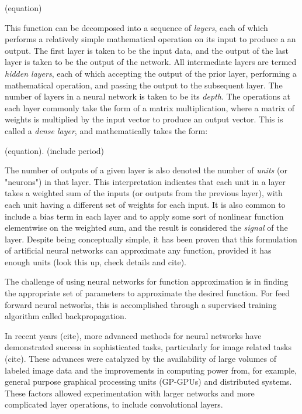 (equation)

This function can be decomposed into a sequence of \textit{layers}, each of which performs a relatively simple mathematical operation on its input to produce a an output.
The first layer is taken to be the input data, and the output of the last layer is taken to be the output of the network. 
All intermediate layers are termed \textit{hidden layers}, each of which accepting the output of the prior layer, performing a mathematical operation, and passing the output to the subsequent layer.
The number of layers in a neural network is taken to be its \textit{depth}.
The operations at each layer commonly take the form of a matrix multiplication, where a matrix of weights is multiplied by the input vector to produce an output vector.
This is called a \textit{dense layer}, and mathematically takes the form:

(equation). (include period)

The number of outputs of a given layer is also denoted the number of \textit{units} (or "neurons") in that layer.
This interpretation indicates that each unit in a layer takes a weighted sum of the inputs (or outputs from the previous layer), with each unit having a different set of weights for each input. 
It is also common to include a bias term in each layer and to apply some sort of nonlinear function elementwise on the weighted sum, and the result is considered the \textit{signal} of the layer.
Despite being conceptually simple, it has been proven that this formulation of artificial neural networks can approximate any function, provided it has enough units (look this up, check details and cite).

The challenge of using neural networks for function approximation is in finding the appropriate set of parameters to approximate the desired function. 
For feed forward neural networks, this is accomplished through a supervised training algorithm called backpropagation. 


In recent years (cite), more advanced methods for neural networks have demonstrated success in sophisticated tasks, particularly for image related tasks (cite). 
These advances were catalyzed by the availability of large volumes of labeled image data and the improvements in computing power from, for example, general purpose graphical processing units (GP-GPUs) and distributed systems.
These factors allowed experimentation with larger networks and more complicated layer operations, to include convolutional layers.

